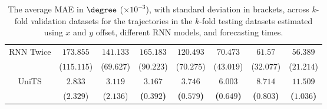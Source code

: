 \begin{table}[!ht]
{\begin{tabular}{|c|c|c|c|c|c|c|c|}
			\multirow{2}{*}{RNN Twice} & $173.855$ & $141.133$ & $165.183$ & $120.493$ & $70.473$ & $61.57$ & $56.389$ \\
			 & ($115.115$) & ($69.627$) & ($90.223$) & ($70.275$) & ($43.019$) & ($32.077$) & ($21.214$) \\ \hline
			\multirow{2}{*}{UniTS} & $2.833$ & $3.119$ & $\mathbf{3.167}$ & $\mathbf{3.746}$ & $\mathbf{6.003}$ & $\mathbf{8.714}$ & $\mathbf{11.509}$ \\
			 & ($2.329$) & ($2.136$) & \textbf{(}$\mathbf{0.392}$\textbf{)} & \textbf{(}$\mathbf{0.579}$\textbf{)} & \textbf{(}$\mathbf{0.649}$\textbf{)} & \textbf{(}$\mathbf{0.803}$\textbf{)} & \textbf{(}$\mathbf{1.036}$\textbf{)} \\ \hline
		\end{tabular}
	}
	\caption{The average MAE in $\degree$ ($\times 10^{-3}$), with standard deviation in brackets, across $k$-fold validation datasets for the trajectories in the $k$-fold testing datasets estimated using $x$ and $y$ offset, different RNN models, and forecasting times.}
	\label{tab:all_no_abs_MAE}
\end{table}

